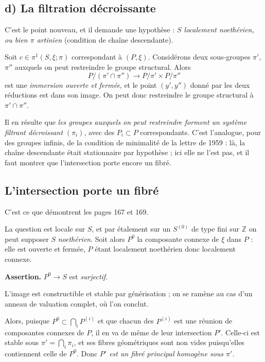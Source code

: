 \documentclass[11pt,a4paper]{article}
\begin{document}
\subsection*{d) La filtration décroissante}

C'est le point nouveau, et il demande une hypothèse : \emph{$S$ localement
noethérien, ou bien $\pi$ artinien} (condition de chaîne descendante).

Soit $c \in \pi^{1}(S,\xi;\pi)$ correspondant à $(P, \xi)$. Considérons deux
sous-groupes $\pi'$, $\pi''$ auxquels on peut restreindre le groupe structural.
Alors
\[
  P/(\pi' \cap \pi'') \longrightarrow P/\pi' \times P/\pi''
\]
est une \emph{immersion ouverte et fermée}, et le point $(y', y'')$ donné par
les deux réductions est dans son image. On peut donc restreindre le groupe
structural à $\pi' \cap \pi''$.

Il en résulte que \emph{les groupes auxquels on peut restreindre forment un
système filtrant décroissant} $(\pi_{i})$, avec des $P_{i} \subset P$
correspondants. C'est l'analogue, pour des groupes infinis, de la condition de
minimalité de la lettre de 1959 : là, la chaîne descendante était stationnaire
par hypothèse ; ici elle ne l'est pas, et il faut montrer que l'intersection
porte encore un fibré.

\subsection*{L'intersection porte un fibré}

C'est ce que démontrent les pages 167 et 169.

La question est locale sur $S$, et par étalement sur un $S^{(0)}$ de type fini
sur $\mathbb{Z}$ on peut supposer $S$ \emph{noethérien}. Soit alors $P^{0}$ la
composante connexe de $\xi$ dans $P$ : elle est ouverte et fermée, $P$ étant
localement noethérien donc localement connexe.

\textbf{Assertion.} $P^{0} \to S$ est \emph{surjectif}.

L'image est constructible et stable par générisation ; on se ramène au cas d'un
anneau de valuation complet, où l'on conclut.

Alors, puisque $P^{0} \subset \bigcap_{i} P^{(i)}$ et que chacun des $P^{(i)}$
est une réunion de composantes connexes de $P$, il en va de même de leur
intersection $P'$. Celle-ci est stable sous $\pi' = \bigcap_{i} \pi_{i}$, et
ses fibres géométriques sont non vides puisqu'elles contiennent celle de
$P^{0}$. Donc \emph{$P'$ est un fibré principal homogène sous $\pi'$}.
\end{document}
